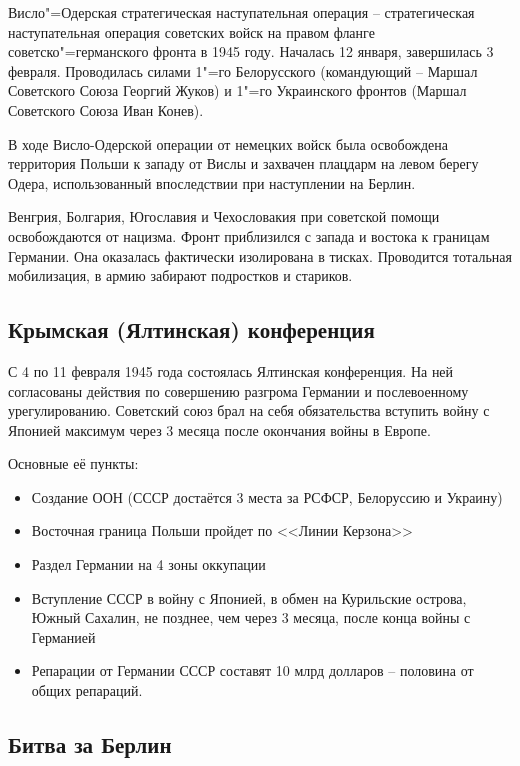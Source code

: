 Висло"=Одерская стратегическая наступательная операция -- стратегическая наступательная операция советских войск на правом фланге советско"=германского фронта в 1945 году. Началась 12 января, завершилась 3 февраля. Проводилась силами 1"=го Белорусского (командующий -- Маршал Советского Союза Георгий Жуков) и 1"=го Украинского фронтов (Маршал Советского Союза Иван Конев).

В ходе Висло-Одерской операции от немецких войск была освобождена территория Польши к западу от Вислы и захвачен плацдарм на левом берегу Одера, использованный впоследствии при наступлении на Берлин. 

Венгрия, Болгария, Югославия и Чехословакия при советской помощи освобождаются от нацизма. Фронт приблизился с запада и востока к границам Германии. Она оказалась фактически изолирована в тисках. Проводится тотальная мобилизация, в армию забирают подростков и стариков.


\subsection{Крымская (Ялтинская) конференция}

С 4 по 11 февраля 1945 года состоялась Ялтинская конференция. На ней согласованы действия по совершению разгрома Германии и послевоенному урегулированию. Советский союз брал на себя обязательства вступить войну с Японией максимум через 3 месяца после окончания войны в Европе.

Основные её пункты:

\begin{itemize}
    \item Создание ООН (СССР достаётся 3 места за РСФСР, Белоруссию и Украину)
    \item Восточная граница Польши пройдет по <<Линии Керзона>>
    \item Раздел Германии на 4 зоны оккупации
    \item Вступление СССР в войну с Японией, в обмен на Курильские острова, Южный Сахалин,  не позднее, чем через 3 месяца, после конца войны с Германией
    \item Репарации от Германии СССР составят 10 млрд долларов -- половина от общих репараций.
\end{itemize}

\subsection{Битва за Берлин}

